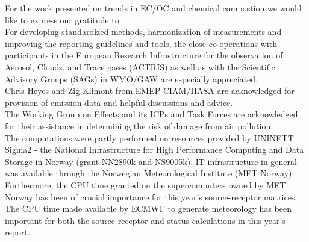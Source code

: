 For the work presented on trends in EC/OC and chemical compostion we would like to express our gratitude to \\

For developing standardized methods, harmonization of measurements and improving the reporting guidelines and tools, the close co-operations with participants in the European Research Infrastructure for the observation of Aerosol, Clouds, and Trace gases (ACTRIS) as well as with the Scientific Advisory Groups (SAGs) in WMO/GAW are especially appreciated. \\

\newpage
Chris Heyes and Zig Klimont from EMEP CIAM/IIASA are acknowledged for provision of emission data and helpful discussions and advice.\\


The Working Group on Effects and its ICPs and Task Forces are
acknowledged for their assistance in determining the risk of damage
from air pollution.\\

The computations were partly performed on resources provided by 
UNINETT Sigma2 - the National Infrastructure for High Performance Computing and 
Data Storage in Norway (grant NN2890k and NS9005k). IT infrastructure in general was available through the Norwegian Meteorological Institute (MET Norway). Furthermore, the CPU time granted on the supercomputers owned by MET Norway has been of crucial importance for this year's source-receptor matrices. The CPU time made available by ECMWF to generate meteorology has been important for both the source-receptor and status calculations in this year's report.\\



